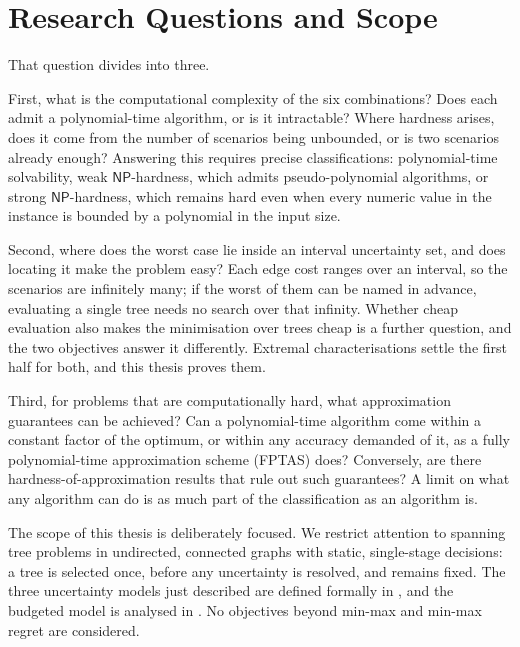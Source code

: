 \section{Research Questions and Scope}\label{sec:intro-scope}

That question divides into three.

First, what is the computational complexity of the six combinations?
Does each admit a polynomial-time algorithm, or is it intractable?
Where hardness arises, does it come from the number of scenarios being unbounded, or is two scenarios already enough?
Answering this requires precise classifications: polynomial-time solvability, weak $\mathsf{NP}$-hardness, which admits pseudo-polynomial algorithms, or strong $\mathsf{NP}$-hardness, which remains hard even when every numeric value in the instance is bounded by a polynomial in the input size.

Second, where does the worst case lie inside an interval uncertainty set, and does locating it make the problem easy?
Each edge cost ranges over an interval, so the scenarios are infinitely many; if the worst of them can be named in advance, evaluating a single tree needs no search over that infinity.
Whether cheap evaluation also makes the minimisation over trees cheap is a further question, and the two objectives answer it differently.
Extremal characterisations settle the first half for both, and this thesis proves them.

Third, for problems that are computationally hard, what approximation guarantees can be achieved?
Can a polynomial-time algorithm come within a constant factor of the optimum, or within any accuracy demanded of it, as a fully polynomial-time approximation scheme (FPTAS) does?
Conversely, are there hardness-of-approximation results that rule out such guarantees?
A limit on what any algorithm can do is as much part of the classification as an algorithm is.

The scope of this thesis is deliberately focused.
We restrict attention to spanning tree problems in undirected, connected graphs with static, single-stage decisions: a tree is selected once, before any uncertainty is resolved, and remains fixed.
The three uncertainty models just described are defined formally in , and the budgeted model is analysed in .
No objectives beyond min-max and min-max regret are considered.

